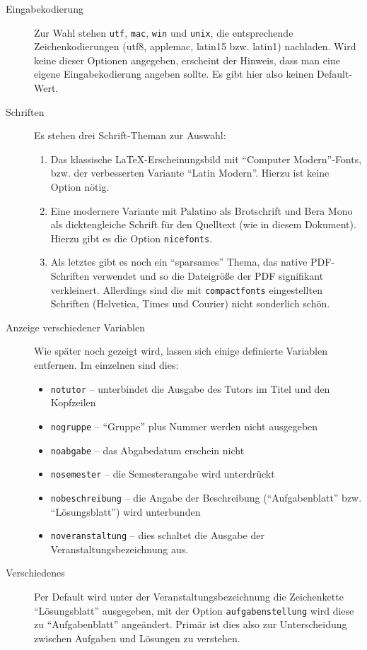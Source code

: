 \documentclass[nicefonts,nogruppe,nosemester,noveranstaltung,notutor,noabgabe,utf]{uhb-inf-tex}
\begin{document}
\begin{description}
	\item[Eingabekodierung] Zur Wahl stehen \texttt{utf}, \texttt{mac}, \texttt{win} und \texttt{unix}, die entsprechende Zeichenkodierungen (utf8, applemac, latin15 bzw. latin1) nachladen. Wird keine dieser Optionen angegeben, erscheint der Hinweis, dass man eine eigene Eingabekodierung angeben sollte. Es gibt hier also keinen Default-Wert.
	\item[Schriften] Es stehen drei Schrift-Theman zur Auswahl:
	\begin{enumerate}
		\item Das klassische \LaTeX-Erscheinungsbild mit "`Computer Modern"'-Fonts, bzw. der verbesserten Variante "`Latin Modern"'. Hierzu ist keine Option nötig.
		\item Eine modernere Variante mit Palatino als Brotschrift und Bera Mono als dicktengleiche Schrift für den Quelltext (wie in diesem Dokument). Hierzu gibt es die Option \texttt{nicefonts}.
		\item Als letztes gibt es noch ein "`sparsames"' Thema, das native PDF-Schriften verwendet und so die Dateigröße der PDF signifikant verkleinert. Allerdings sind die mit \texttt{compactfonts} eingestellten Schriften (Helvetica, Times und Courier) nicht sonderlich schön.
	\end{enumerate}
	\item[Anzeige verschiedener Variablen] Wie später noch gezeigt wird, lassen sich einige definierte Variablen entfernen. Im einzelnen sind dies:
	\begin{itemize}
		\item \texttt{notutor} -- unterbindet die Ausgabe des Tutors im Titel und den Kopfzeilen
		\item \texttt{nogruppe} -- "`Gruppe"' plus Nummer werden nicht ausgegeben
		\item \texttt{noabgabe} -- das Abgabedatum erschein nicht
		\item \texttt{nosemester} -- die Semesterangabe wird unterdrückt
		\item \texttt{nobeschreibung} -- die Angabe der Beschreibung ("`Aufgabenblatt"' bzw. "`Lösungsblatt"') wird unterbunden
		\item \texttt{noveranstaltung} -- dies schaltet die Ausgabe der Veranstaltungsbezeichnung aus.
	\end{itemize}
	\item[Verschiedenes]
	Per Default wird unter der Veranstaltungsbezeichnung die Zeichenkette "`Lösungsblatt"' ausgegeben, mit der Option \texttt{aufgabenstellung} wird diese zu "`Aufgabenblatt"' angeändert. Primär ist dies also zur Unterscheidung zwischen Aufgaben und Lösungen zu verstehen.
\end{description}
\end{document}
